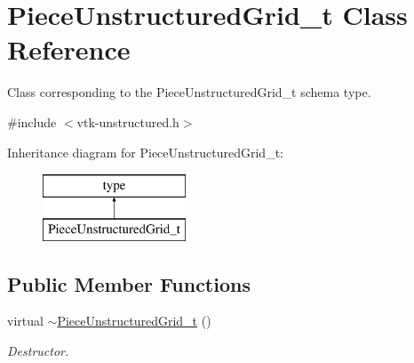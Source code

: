 \hypertarget{classPieceUnstructuredGrid__t}{\section{Piece\+Unstructured\+Grid\+\_\+t Class Reference}
\label{classPieceUnstructuredGrid__t}
}


Class corresponding to the Piece\+Unstructured\+Grid\+\_\+t schema type.  




{\ttfamily \#include $<$vtk-\/unstructured.\+h$>$}

Inheritance diagram for Piece\+Unstructured\+Grid\+\_\+t\+:\begin{figure}[H]
\begin{center}
\leavevmode
\includegraphics[height=2.000000cm]{classPieceUnstructuredGrid__t}
\end{center}
\end{figure}
\subsection*{Public Member Functions}
\begin{DoxyCompactItemize}
\item 
virtual \hyperlink{classPieceUnstructuredGrid__t_a9d1eb720775ac4e3b7778f898decc264}{$\sim$\+Piece\+Unstructured\+Grid\+\_\+t} ()
\begin{DoxyCompactList}\small\item\em Destructor. \end{DoxyCompactList}\end{DoxyCompactItemize}
